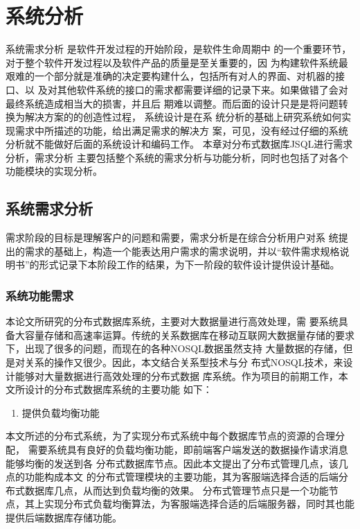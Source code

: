 
\chapter{系统分析}
系统需求分析
是软件开发过程的开始阶段，是软件生命周期中
的一个重要环节，对于整个软件开发过程以及软件产品的质量是至关重要的，因
为构建软件系统最艰难的一个部分就是准确的决定要构建什么，包括所有对人的界面、对机器的接口、以
及对其他软件系统的接口的需求都需要详细的记录下来。如果做错了会对最终系统造成相当大的损害，并且后
期难以调整。而后面的设计只是是将问题转换为解决方案的的创造性过程，
系统设计是在系
统分析的基础上研究系统如何实现需求中所描述的功能，给出满足需求的解决方
案，可见，没有经过仔细的系统分析就不能做好后面的系统设计和编码工作。
本章对分布式数据库JSQL进行需求分析，需求分析
主要包括整个系统的需求分析与功能分析，同时也包括了对各个功能模块的实现分析。
\section{系统需求分析}
需求阶段的目标是理解客户的问题和需要，需求分析是在综合分析用户对系
统提出的需求的基础上，构造一个能表达用户需求的需求说明，并以“软件需求规格说明书”的形式记录下本阶段工作的结果，为下一阶段的软件设计提供设计基础。
\subsection{系统功能需求}
本论文所研究的分布式数据库系统，主要对大数据量进行高效处理，需
要系统具备大容量存储和高速率运算。传统的关系数据库在移动互联网大数据量存储的要求下，出现了很多的问题，而现在的各种NOSQL数据虽然支持
大量数据的存储，但是对关系的操作又很少。因此，本文结合关系型技术与分
布式NOSQL技术，来设计能够对大量数据进行高效处理的分布式数据
库系统。作为项目的前期工作，本文所设计的分布式数据库系统的主要功能
如下：


	\begin{enumerate}
		\item 提供负载均衡功能
	\end{enumerate}

	本文所述的分布式系统，为了实现分布式系统中每个数据库节点的资源的合理分配，
	需要系统具有良好的负载均衡功能，即前端客户端发送的数据操作请求消息能够均衡的发送到各
	分布式数据库节点。因此本文提出了分布式管理几点，该几点的功能构成本文
	的分布式管理模块的主要功能，其为客服端选择合适的后端分布式数据库几点，从而达到负载均衡的效果。
	分布式管理节点只是一个功能节点，其上实现分布式负载均衡算法，为客服端选择合适的后端服务器，同时其也能提供后端数据库存储功能。
	
